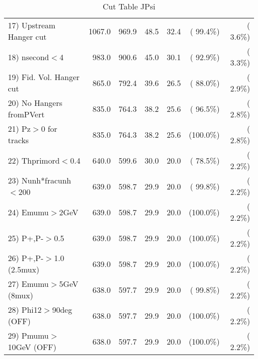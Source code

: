 \begin{table}[h!]
\begin{tabular}{||l||r|r|r|r|r|r||}
 17) Upstream Hanger cut  &       1067.0 &        969.9 &         48.5 &         32.4 & ( 99.4\%) & (  3.6\%) \\
 18) nsecond$<$4          &        983.0 &        900.6 &         45.0 &         30.1 & ( 92.9\%) & (  3.3\%) \\
 19) Fid. Vol. Hanger cut &        865.0 &        792.4 &         39.6 &         26.5 & ( 88.0\%) & (  2.9\%) \\
 20) No Hangers fromPVert &        835.0 &        764.3 &         38.2 &         25.6 & ( 96.5\%) & (  2.8\%) \\
 21) Pz$>$0 for tracks    &        835.0 &        764.3 &         38.2 &         25.6 & (100.0\%) & (  2.8\%) \\
 22) Thprimord$<$0.4      &        640.0 &        599.6 &         30.0 &         20.0 & ( 78.5\%) & (  2.2\%) \\
 23) Nunh*fracunh$<$200   &        639.0 &        598.7 &         29.9 &         20.0 & ( 99.8\%) & (  2.2\%) \\
 24) Emumu$>$2GeV         &        639.0 &        598.7 &         29.9 &         20.0 & (100.0\%) & (  2.2\%) \\
 25) P+,P-$>$0.5          &        639.0 &        598.7 &         29.9 &         20.0 & (100.0\%) & (  2.2\%) \\
 26) P+,P-$>$1.0 (2.5mux) &        639.0 &        598.7 &         29.9 &         20.0 & (100.0\%) & (  2.2\%) \\
 27) Emumu$>$5GeV  (8mux) &        638.0 &        597.7 &         29.9 &         20.0 & ( 99.8\%) & (  2.2\%) \\
 28) Phi12$>$90deg  (OFF) &        638.0 &        597.7 &         29.9 &         20.0 & (100.0\%) & (  2.2\%) \\
 29) Pmumu$>$10GeV  (OFF) &        638.0 &        597.7 &         29.9 &         20.0 & (100.0\%) & (  2.2\%) \\
 \hline
 \hline
 \end{tabular}
 \caption{Cut Table  JPsi     }
 \label{tab-cutcohjpsi-mumu_cohrhop}
 \end{table}
